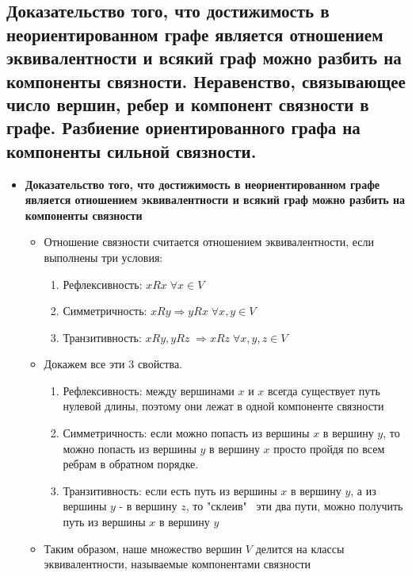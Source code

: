 \subsection{Доказательство того, что достижимость в неориентированном графе является отношением эквивалентности и всякий граф можно разбить на компоненты связности. Неравенство, связывающее число вершин, ребер и компонент связности в графе. Разбиение ориентированного графа на компоненты сильной связности.}
\begin{itemize}
	\item \textbf{Доказательство того, что достижимость в неориентированном графе является отношением эквивалентности и всякий граф можно разбить на компоненты связности}

		\begin{itemize}
		    \item
		        Отношение связности считается отношением эквивалентности, если выполнены три условия:
		        \begin{enumerate}
		        \item Рефлексивность: $xRx \; \forall x \in V$
		        \item Симметричность: $xRy \Rightarrow yRx \; \forall x, y \in V$
		        \item Транзитивность: $xRy, yRz \; \Rightarrow xRz \; \forall x, y, z \in V$
		        \end{enumerate}
		    \item
		    Докажем все эти 3 свойства.
		        \begin{enumerate}
		        \item
		        Рефлексивность: между вершинами $x$ и $x$ всегда существует путь нулевой длины, поэтому они лежат в одной компоненте связности
		
		        \item
		        Симметричность: если можно попасть из вершины $x$ в вершину $y$, то можно попасть из вершины $y$ в вершину $x$ просто пройдя по всем ребрам в обратном порядке.
		
		        \item
		        Транзитивность: если есть путь из вершины $x$ в вершину $y$, а из вершины $y$ - в вершину $z$, то "склеив" \, эти два пути, можно получить путь из вершины $x$ в вершину $y$
		
		        \end{enumerate}
		    \item
		    Таким образом, наше множество вершин $V$ делится на классы эквивалентности, называемые компонентами связности
		

\end{itemize}
\end{itemize}
